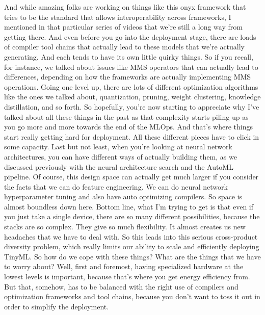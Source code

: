 {{{{{     And while amazing folks are working on things like this onyx framework that
     tries to be the standard that allows interoperability across frameworks,
     I mentioned in that particular series of videos
     that we're still a long way from getting there.
     And even before you go into the deployment stage,
     there are loads of compiler tool chains that actually lead to these models
     that we're actually generating.
     And each tends to have its own little quirky things.
     So if you recall, for instance, we talked about issues like MMS operators
     that can actually lead to differences, depending
     on how the frameworks are actually implementing MMS operations.
     Going one level up, there are lots of different optimization algorithms
     like the ones we talked about, quantization, pruning,
     weight clustering, knowledge distillation, and so forth.
     So hopefully, you're now starting to appreciate
     why I've talked about all these things in the past
     as that complexity starts piling up as you go more
     and more towards the end of the MLOps.
     And that's where things start really getting hard for deployment.
     All these different pieces have to click in some capacity.
     Last but not least, when you're looking at neural network architectures,
     you can have different ways of actually building them,
     as we discussed previously with the neural architecture
     search and the AutoML pipeline.
     Of course, this design space can actually
     get much larger if you consider the facts
     that we can do feature engineering.
     We can do neural network hyperparameter tuning
     and also have auto optimizing compilers.
     So space is almost boundless down here.
     Bottom line, what I'm trying to get is that even if you just
     take a single device, there are so many different possibilities,
     because the stacks are so complex.
     They give so much flexibility.
     It almost creates us new headaches that we have to deal with.
     So this leads into this serious cross-product diversity
     problem, which really limits our ability to scale and efficiently deploying
     TinyML.
     So how do we cope with these things?
     What are the things that we have to worry about?
     Well, first and foremost, having specialized hardware
     at the lowest levels is important, because that's
     where you get energy efficiency from.
     But that, somehow, has to be balanced with the right use of compilers
     and optimization frameworks and tool chains,
     because you don't want to toss it out in order to simplify the deployment.
}}}}}
